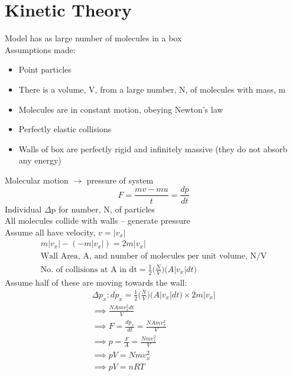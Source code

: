\documentclass[a4paper, 11pt, fleqn, normalem]{report}
\begin{document}
\section{Kinetic Theory}
Model has as large number of molecules in a box \\
Assumptions made:
\begin{itemize}
	\item[] Point particles
	\item[] There is a volume, V, from a large number, N, of molecules with mass, m
	\item[] Molecules are in constant motion, obeying Newton's law
	\item[] Perfectly elastic collisions
	\item[] Walls of box are perfectly rigid and infinitely massive (they do not absorb any energy)
\end{itemize}
Molecular motion $\rightarrow$ pressure of system
\begin{equation*}
	F = \frac{mv-mu}{t} = \frac{dp}{dt}
\end{equation*}
Individual $\Delta$p for number, N, of particles \\
All molecules collide with walls -- generate pressure \\
Assume all have velocity, $v = |v_{x}|$
\begin{gather*}
	m|v_{x}| - (-m|v_{x}|) = 2m|v_{x}| \\
	\text{Wall Area, A, and number of molecules per unit volume, N/V} \\
	\text{No. of collisions at A in dt} = \frac{1}{2}\Big(\frac{N}{V}\Big)\big(A|v_{x}|dt\big)
\end{gather*}
Assume half of these are moving towards the wall:
\begin{gather*}
	{\Delta}p_{x}: dp_{x} = \frac{1}{2}\Big(\frac{N}{V}\Big)\big(A|v_{x}|dt\big) \times 2m|v_{x}| \\
	\implies \frac{NAmv^{2}_{x}dt}{V} \\
	\implies F = \frac{dp_{x}}{dt} = \frac{NAmv^{2}_{x}}{V} \\
	\implies p = \frac{F}{A} = \frac{Nmv^{2}_{x}}{V} \\
	\implies pV = Nmv^{2}_{x} \\
	\implies pV = nRT
\end{gather*}
\end{document}
